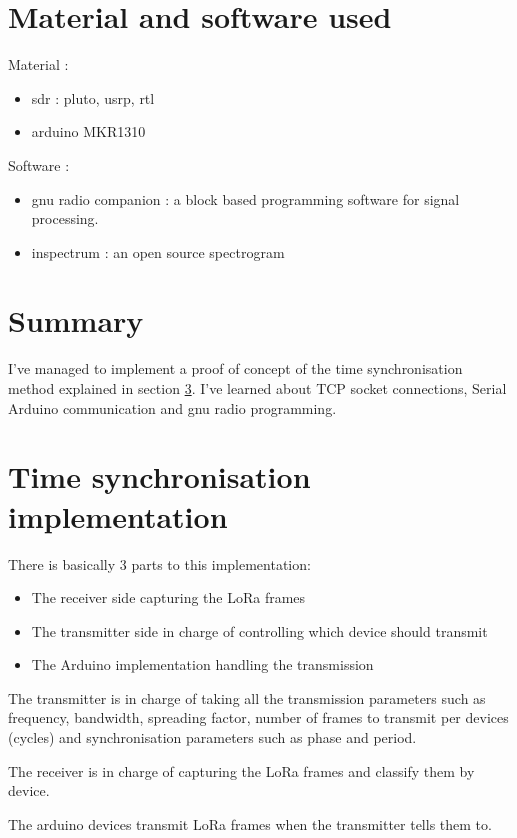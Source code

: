 \documentclass[a4paper, 12pt]{article}
\begin{document}
\section{Material and software used}
Material :
\begin{itemize}
  \item sdr : pluto, usrp, rtl
  \item arduino MKR1310
\end{itemize}
Software : 
\begin{itemize}
  \item gnu radio companion : a block based programming software for signal processing.
  \item inspectrum : an open source spectrogram

\end{itemize}

\section{Summary}
I've managed to implement a proof of concept of the time synchronisation method explained in section \ref{TSi}.
I've learned about TCP socket connections, Serial Arduino communication and gnu radio programming.

\section{Time synchronisation implementation} \label{TSi}
There is basically 3 parts to this implementation: 
\begin{itemize}
  \item The receiver side capturing the LoRa frames
  \item The transmitter side in charge of controlling which device should transmit
  \item The Arduino implementation handling the transmission
\end{itemize}

The transmitter is in charge of taking all the transmission parameters such as frequency, bandwidth, spreading factor, number of frames to transmit per devices (cycles) and synchronisation parameters such as phase and period.

The receiver is in charge of capturing the LoRa frames and classify them by device.

The arduino devices transmit LoRa frames when the transmitter tells them to.

\vspace{1cm}
\end{document}
